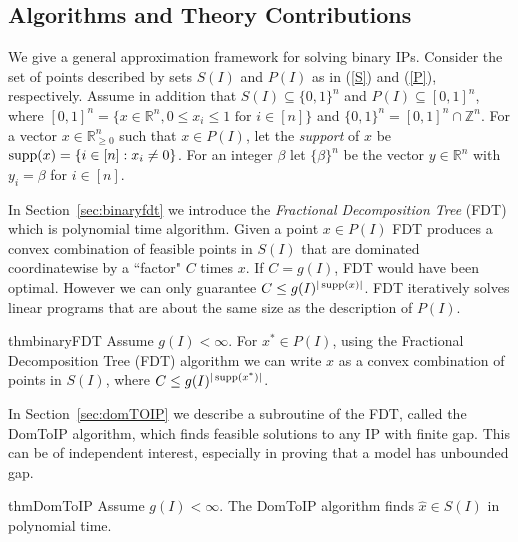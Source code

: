 \subsection{Algorithms and Theory Contributions} 
 
We give a general approximation framework for solving binary IPs.
Consider the set of points described by sets $S(I)$ and $P(I)$ as in (\ref{S}) and (\ref{P}), respectively. Assume in addition that $S(I)\subseteq  \{0,1\}^n$ and $P(I)\subseteq [0,1]^n$, where $[0,1]^n = \{x\in \mathbb{R}^n, 0\leq x_i\leq 1 \mbox{ for } i\in[n]\}$ and $\{0,1\}^n = [0,1]^n \cap \mathbb{Z}^n$.
For a vector $x\in \mathbb{R}_{\geq 0}^n$ such that $x\in P(I)$, let the {\em support} of $x$ be $\operatorname{supp}(x)= \{i \in [n]: x_i \neq 0\}$. For an integer $\beta$ let $\{\beta\}^n$ be the vector $y\in \mathbb{R}^n$ with $y_i=\beta$ for $i\in [n]$.


In Section~\ref{sec:binaryfdt} we introduce the \textit{Fractional Decomposition Tree} (FDT) which is polynomial time algorithm. Given a point $x\in P(I)$ FDT produces a convex combination of feasible points in $S(I)$ that are dominated coordinatewise by a ``factor" $C$ times $x$.
If $C = g(I)$, FDT would have been optimal. However we can only guarantee $C\leq g(I)^{|\operatorname{supp}(x)|}$. FDT iteratively solves linear programs that are about the same size as the description of $P(I)$.

\begin{restatable}{thm}{binaryFDT}
	\label{binaryFDT}
	Assume $g(I) 	<\infty$. For $x^*\in P(I)$, using 	the Fractional Decomposition Tree (FDT) algorithm we can write $x$ as a convex combination of points in $S(I)$, where $C\leq g(I)^{|\operatorname{supp}(x^*)|}$.
\end{restatable}

In Section~\ref{sec:domTOIP} we describe a subroutine of the FDT, called the DomToIP algorithm, which finds feasible solutions to any IP with finite gap. This can be of independent interest, especially in proving that a model has unbounded gap.
\begin{restatable}{thm}{DomToIP}
	\label{domtoIP}
	Assume $g(I) < \infty$. The DomToIP algorithm finds $\hat{x}\in S(I)$ in polynomial time.
\end{restatable}


